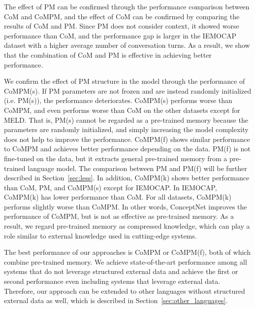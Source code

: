 \documentclass[11pt]{article}
\begin{document}
The effect of PM can be confirmed through the performance comparison between CoM and CoMPM, and the effect of CoM can be confirmed by comparing the results of CoM and PM. Since PM does not consider context, it showed worse performance than CoM, and the performance gap is larger in the IEMOCAP dataset with a higher average number of conversation turns. As a result, we show that the combination of CoM and PM is effective in achieving better performance.


We confirm the effect of PM structure in the model through the performance of CoMPM(s). If PM parameters are not frozen and are instead randomly initialized (i.e. PM(s)), the performance deteriorates. CoMPM(s) performs worse than CoMPM, and even performs worse than CoM on the other datasets except for MELD. That is, PM(s) cannot be regarded as a pre-trained memory because the parameters are randomly initialized, and simply increasing the model complexity does not help to improve the performance. CoMPM(f) shows similar performance to CoMPM and achieves better performance depending on the data. PM(f) is not fine-tuned on the data, but it extracts general pre-trained memory from a pre-trained language model. The comparison between PM and PM(f) will be further described in Section~\ref{sec:less}. In addition, CoMPM(k) shows better performance than CoM, PM, and CoMPM(s) except for IEMOCAP. In IEMOCAP, CoMPM(k) has lower performance than CoM. For all datasets, CoMPM(k) performs slightly worse than CoMPM. In other words, ConceptNet improves the performance of CoMPM, but is not as effective as pre-trained memory. As a result, we regard pre-trained memory as compressed knowledge, which can play a role similar to external knowledge used in cutting-edge systems.





The best performance of our approaches is CoMPM or CoMPM(f), both of which combine pre-trained memory. We achieve state-of-the-art performance among all systems that do not leverage structured external data and achieve the first or second performance even including systems that leverage external data. Therefore, our approach can be extended to other languages without structured external data as well, which is described in Section~\ref{sec:other_languages}.
\end{document}
